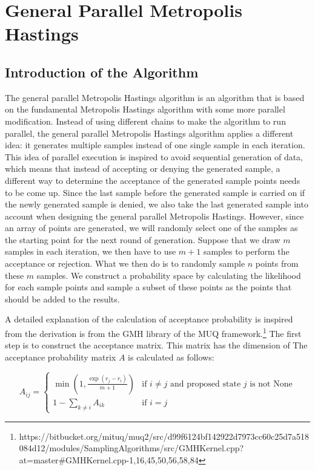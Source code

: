 \chapter{General Parallel Metropolis Hastings}

\section{Introduction of the Algorithm}
The general parallel Metropolis Hastings algorithm is an algorithm that is based on the fundamental Metropolis Hastings algorithm with some more parallel modification. Instead of using different chains to make the algorithm to run parallel, the general parallel Metropolis Hastings algorithm applies a different idea: it generates multiple samples instead of one single sample in each iteration. This idea of parallel execution is inspired to avoid sequential generation of data,\cite{gpmh_broshure} which means that instead of accepting or denying the generated sample, a different way to determine the acceptance of the generated sample points needs to be come up. Since the last sample before the generated sample is carried on if the newly generated sample is denied, we also take the last generated sample into account when designing the general parallel Metropolis Hastings. However, since an array of points are generated, we will randomly select one of the samples as the starting point for the next round of generation.\cite{gpmh_derivation} Suppose that we draw $m$ samples in each iteration, we then have to use $m + 1$ samples to perform the acceptance or rejection. What we then do is to randomly sample $n$ points from these $m$ samples. We construct a probability space by calculating the likelihood for each sample points and sample a subset of these points as the points that should be added to the results.

A detailed explanation of the calculation of acceptance probability is inspired from the derivation is from the GMH library of the MUQ framework.\footnote{https://bitbucket.org/mituq/muq2/src/d99f6124bf142922d7973cc60c25d7a518084d12/modules/SamplingAlgorithms/src/GMHKernel.cpp?at=master#GMHKernel.cpp-1,16,45,50,56,58,84} The first step is to construct the acceptance matrix. This matrix has the dimension of  The acceptance probability matrix \( A \) is calculated as follows:

\begin{equation}
A_{ij} = 
\begin{cases} 
\min\left(1, \frac{\exp(r_j - r_i)}{m + 1}\right) & \text{if } i \neq j \text{ and } \text{proposed state } j \text{ is not None} \\
1-\sum_{k \neq i} A_{ik} & \text{if } i = j
\end{cases}
\end{equation}

